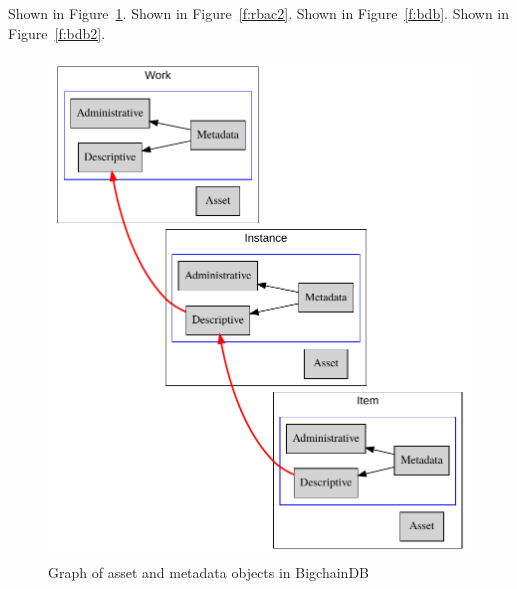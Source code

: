 Shown in Figure~\ref{f:rbac}.
Shown in Figure~\ref{f:rbac2}.
Shown in Figure~\ref{f:bdb}. 
Shown in Figure~\ref{f:bdb2}.


\begin{figure}[!htb]
	\centering\includegraphics[width=\columnwidth]{images/assets-metadata.pdf}  
	\caption{Graph of asset and metadata objects in BigchainDB}\label{f:rbac}
\end{figure}

